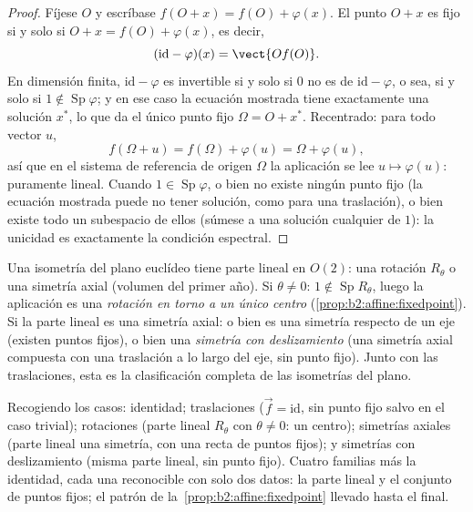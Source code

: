 \begin{proof}
Fíjese $O$ y escríbase $f(O + x) = f(O) + \varphi(x)$. El punto $O +
x$ es fijo si y solo si $O + x = f(O) + \varphi(x)$, es decir,
\[
(\mathrm{id} - \varphi)(x) = \vect{O f(O)} .
\]
En dimensión finita, $\mathrm{id} - \varphi$ es invertible si y solo
si $0$ no es  de $\mathrm{id} - \varphi$, o sea, si y solo
si $1 \notin \operatorname{Sp}\varphi$; y en ese caso la ecuación
mostrada tiene exactamente una solución $x^*$, lo que da el único
punto fijo $\Omega = O + x^*$. Recentrado: para todo vector $u$,
\[
f(\Omega + u) = f(\Omega) + \varphi(u) = \Omega + \varphi(u),
\]
así que en el sistema de referencia de origen $\Omega$ la aplicación
se lee $u \mapsto \varphi(u)$: puramente lineal. Cuando $1 \in
\operatorname{Sp}\varphi$, o bien no existe ningún punto fijo (la
ecuación mostrada puede no tener solución, como para una traslación),
o bien existe todo un subespacio  de ellos (súmese a una solución
cualquier  de  $1$): la unicidad es
exactamente la condición espectral.
\end{proof}

\begin{example}\label{ex:b2:affine:isometries}
Una isometría  del plano euclídeo tiene parte lineal en $O(2)$:
una rotación $R_\theta$ o una simetría axial (volumen del primer
año). Si $\theta \neq 0$: $1 \notin \operatorname{Sp} R_\theta$,
luego la aplicación es una \emph{rotación en torno a un único
centro} (\cref{prop:b2:affine:fixedpoint}). Si la parte lineal es una
simetría axial: o bien es una simetría respecto de un eje (existen
puntos fijos), o bien una \emph{simetría con deslizamiento} (una
simetría axial compuesta con una traslación a lo largo del eje, sin
punto fijo). Junto con las traslaciones, esta es la clasificación
completa de las isometrías del plano.
\end{example}

\begin{remark}
Recogiendo los casos: identidad; traslaciones ($\vec f =
\mathrm{id}$, sin punto fijo salvo en el caso trivial); rotaciones
(parte lineal $R_\theta$ con $\theta \neq 0$: un centro); simetrías
axiales (parte lineal una simetría, con una recta de puntos fijos); y
simetrías con deslizamiento (misma parte lineal, sin punto fijo).
Cuatro familias más la identidad, cada una reconocible con solo dos
datos: la parte lineal y el conjunto de puntos fijos; el patrón de la~\cref{prop:b2:affine:fixedpoint} llevado hasta el final.
\end{remark}

